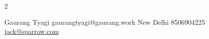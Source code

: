 \documentclass[lighthipster]{simplehipstercv}
\newlength{\rightcolwidth}
\begin{document}
\begin{paracol}{2}
\begin{minipage}[t]{0.3\textwidth}
\end{minipage}\hfill
\begin{minipage}[t]{0.3\textwidth}

\bigskip

\end{minipage}






\vfill{} %

\setlength{\parindent}{0pt}
\begin{minipage}[t]{\rightcolwidth}
\begin{center}\fontfamily{\sfdefault}\selectfont \color{black!70}
{\small Gaurang Tyagi  gaurangtyagi@gaurang.work  New Delhi  8506904225 \newline{} \protect\url{jack@sparrow.com}
}
\end{center}
\end{minipage}

\end{paracol}
\end{document}
